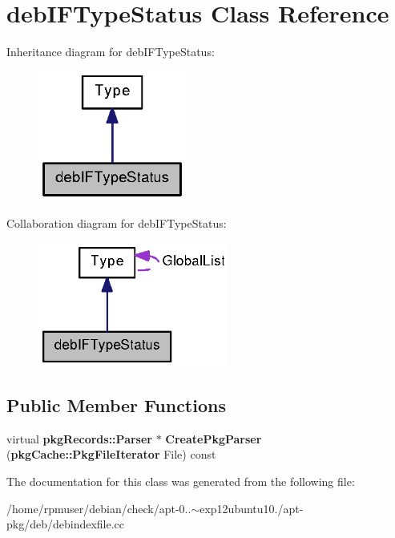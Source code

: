 \section{deb\-I\-F\-Type\-Status \-Class \-Reference}
\label{classdebIFTypeStatus}


\-Inheritance diagram for deb\-I\-F\-Type\-Status\-:
\nopagebreak
\begin{figure}[H]
\begin{center}
\leavevmode
\includegraphics[width=138pt]{classdebIFTypeStatus__inherit__graph}
\end{center}
\end{figure}


\-Collaboration diagram for deb\-I\-F\-Type\-Status\-:
\nopagebreak
\begin{figure}[H]
\begin{center}
\leavevmode
\includegraphics[width=178pt]{classdebIFTypeStatus__coll__graph}
\end{center}
\end{figure}
\subsection*{\-Public \-Member \-Functions}
\begin{DoxyCompactItemize}
\item 
virtual {\bf pkg\-Records\-::\-Parser} $\ast$ {\bfseries \-Create\-Pkg\-Parser} ({\bf pkg\-Cache\-::\-Pkg\-File\-Iterator} \-File) const \label{classdebIFTypeStatus_a5c7bfcd901abdb70ec482bc768d0d7fa}

\end{DoxyCompactItemize}


\-The documentation for this class was generated from the following file\-:\begin{DoxyCompactItemize}
\item 
/home/rpmuser/debian/check/apt-\/0..$\sim$exp12ubuntu10./apt-\/pkg/deb/debindexfile.\-cc\end{DoxyCompactItemize}
